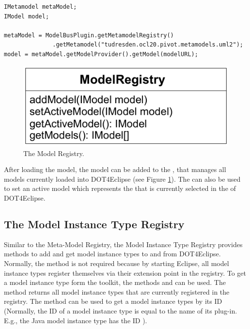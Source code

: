 \lstset{
  language=Java
}
\begin{lstlisting}[caption={How to load a model.}, captionpos=b, label=lst:integration:loadModel, float]
IMetamodel metaModel;
IModel model;

metaModel =	ModelBusPlugin.getMetamodelRegistry()
              .getMetamodel("tudresden.ocl20.pivot.metamodels.uml2");
model = metaModel.getModelProvider().getModel(modelURL);
\end{lstlisting}

\begin{figure}[!b]
	\centering
	\includegraphics[width=.55\linewidth]{figures/integration/modelRegistry}
	\caption{The Model Registry.}
	\label{pic:integration:modelRegistry}
\end{figure}

After loading the model, the model can be added to the , that manages all models currently loaded into \acl{DOT4Eclipse} (see Figure \ref{pic:integration:modelRegistry}). The  can also be used to set an active model which represents the  that is currently selected in the  of \acl{DOT4Eclipse}.


\subsection{The Model Instance Type Registry}

Similar to the Meta-Model Registry, the Model Instance Type Registry provides methods to add and get model instance types to and from \acl{DOT4Eclipse}. Normally, the method  is not required because by starting Eclipse, all model instance types register themselves via their extension point in the registry. To get a model instance type form the toolkit, the methods  and  can be used. The method  returns all model instance types that are currently registered in the registry. The method  can be used to get a model instance types by its ID (Normally, the ID of a model instance type is equal to the name of its plug-in. E.g., the \acs{Java} model instance type has the ID ).

